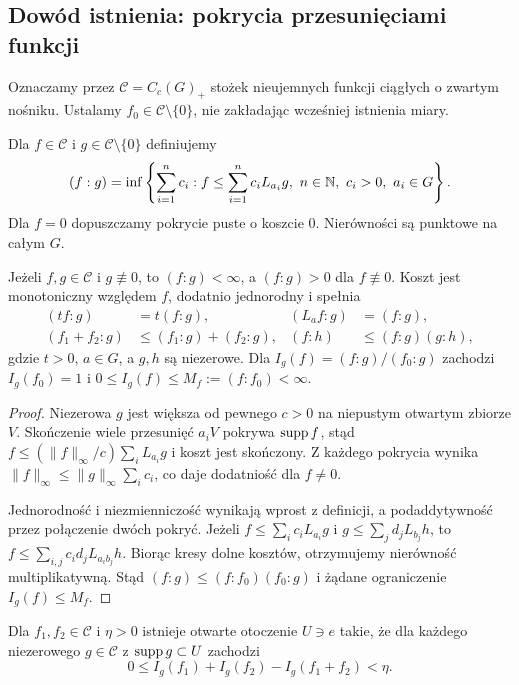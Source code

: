 \subsection*{Dowód istnienia: pokrycia przesunięciami funkcji}
Oznaczamy przez $\mathcal C=C_c(G)_+$ stożek nieujemnych funkcji ciągłych o zwartym nośniku. Ustalamy $f_0\in\mathcal C\setminus\{0\}$, nie zakładając wcześniej istnienia miary.
\begin{definicja}
Dla $f\in\mathcal C$ i $g\in\mathcal C\setminus\{0\}$ definiujemy
\[
(f:g)=\inf\left\{\sum_{i=1}^n c_i:f\le\sum_{i=1}^n c_iL_{a_i}g,\ n\in\mathbb N,\ c_i>0,\ a_i\in G\right\}.
\]
Dla $f=0$ dopuszczamy pokrycie puste o koszcie $0$. Nierówności są punktowe na całym $G$.
\end{definicja}
\begin{lemat}
Jeżeli $f,g\in\mathcal C$ i $g\not\equiv0$, to $(f:g)<\infty$, a $(f:g)>0$ dla $f\not\equiv0$. Koszt jest monotoniczny względem $f$, dodatnio jednorodny i spełnia
\[
\begin{aligned}
(tf:g)&=t(f:g), & (L_af:g)&=(f:g),\\
(f_1+f_2:g)&\le(f_1:g)+(f_2:g), & (f:h)&\le(f:g)(g:h),
\end{aligned}
\]
gdzie $t>0$, $a\in G$, a $g,h$ są niezerowe. Dla $I_g(f)=(f:g)/(f_0:g)$ zachodzi $I_g(f_0)=1$ i $0\le I_g(f)\le M_f:=(f:f_0)<\infty$.
\end{lemat}
\begin{proof}
Niezerowa $g$ jest większa od pewnego $c>0$ na niepustym otwartym zbiorze $V$. Skończenie wiele przesunięć $a_iV$ pokrywa $\operatorname{supp} f$, stąd $f\le(\|f\|_\infty/c)\sum_iL_{a_i}g$ i koszt jest skończony. Z każdego pokrycia wynika $\|f\|_\infty\le\|g\|_\infty\sum_ic_i$, co daje dodatniość dla $f\ne0$.

Jednorodność i niezmienniczość wynikają wprost z definicji, a podaddytywność przez połączenie dwóch pokryć. Jeżeli $f\le\sum_ic_iL_{a_i}g$ i $g\le\sum_jd_jL_{b_j}h$, to $f\le\sum_{i,j}c_id_jL_{a_ib_j}h$. Biorąc kresy dolne kosztów, otrzymujemy nierówność multiplikatywną. Stąd $(f:g)\le(f:f_0)(f_0:g)$ i żądane ograniczenie $I_g(f)\le M_f$.
\end{proof}
\begin{lemat}
Dla $f_1,f_2\in\mathcal C$ i $\eta>0$ istnieje otwarte otoczenie $U\ni e$ takie, że dla każdego niezerowego $g\in\mathcal C$ z $\operatorname{supp} g\subset U$ zachodzi
\[
0\le I_g(f_1)+I_g(f_2)-I_g(f_1+f_2)<\eta.
\]
\end{lemat}
